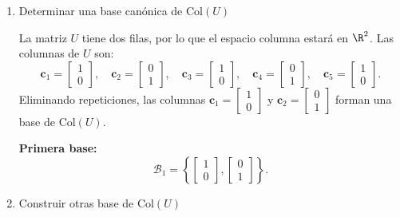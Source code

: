 \begin{enumerate}[label=\color{red}\textbf{\arabic*)}]
\begin{enumerate}[label=\color{red}\textbf{\alph*)}]
            \begin{enumerate}[label=Paso \arabic*:]
                \item Determinar una base canónica de $\mathrm{Col}(U)$ 

                    La matriz $U$ tiene dos filas, por lo que el espacio columna estará en $\R^2$. Las columnas de $U$ son: \[
                    \mathbf{c}_1=\begin{bmatrix} 
                    1\\ 0 
                    \end{bmatrix} ,\quad\mathbf{c}_2=\begin{bmatrix} 
                    0\\ 1 
                    \end{bmatrix} ,\quad\mathbf{c}_3=\begin{bmatrix} 
                    1\\ 0 
                    \end{bmatrix} ,\quad\mathbf{c}_4=\begin{bmatrix} 
                    0\\ 1 
                    \end{bmatrix},\quad\mathbf{c}_5=\begin{bmatrix} 
                    1\\ 0 
                    \end{bmatrix}.
                    \] 
Eliminando repeticiones, las columnas $\mathbf{c}_1=\begin{bmatrix} 
                    1\\ 0 
                    \end{bmatrix}$ y $\mathbf{c}_2=\begin{bmatrix} 
                    0\\ 1 
                    \end{bmatrix}$ forman una base de $\mathrm{Col}(U)$.

                    \textbf{Primera base:} \[
                    \mathcal{B}_1=\left\{ \begin{bmatrix} 
                    1\\0 
                    \end{bmatrix},\begin{bmatrix} 
                    0\\ 1 
                    \end{bmatrix}   \right\} .
                    \]  
                \item Construir otras base de $\mathrm{Col}(U)$ 


\end{enumerate}
\end{enumerate}
\end{enumerate}
